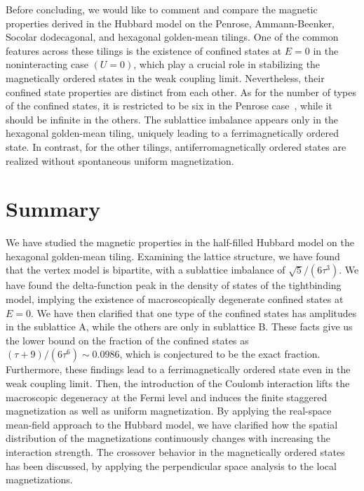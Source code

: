 \documentclass[aps,twocolumn,pra,superscriptaddress,amsmath,amssymb]{revtex4-1}
\begin{document}
Before concluding,
we would like to comment and compare the magnetic properties derived in the Hubbard model
on the Penrose, Ammann-Beenker, Socolar dodecagonal, and hexagonal golden-mean tilings.
One of the common features across these tilings is the existence of confined states at $E=0$
in the noninteracting case $(U=0)$,
which play a crucial role in stabilizing the magnetically ordered states
in the weak coupling limit.
Nevertheless, their confined state properties are distinct from each other.
As for the number of types of the confined states,
it is restricted to be six in the Penrose case~\cite{KohmotoSutherland,Arai},
while it should be infinite in the others.
The sublattice imbalance appears only in the hexagonal golden-mean tiling, uniquely
leading to a ferrimagnetically ordered state.
In contrast, for the other tilings, antiferromagnetically ordered states are realized
without spontaneous uniform magnetization.

\section{Summary}\label{sec:summmary}
We have studied the magnetic properties in the half-filled Hubbard model
on the hexagonal golden-mean tiling.
Examining the lattice structure, we have found that the vertex model is bipartite,
with a sublattice imbalance of $\sqrt{5}/(6\tau^3)$.
We have found the delta-function peak in the density of states of the tightbinding model,
implying the existence of macroscopically degenerate confined states at $E=0$.
We have then clarified that one type of the confined states has amplitudes in the sublattice A, while the others are only in sublattice B.
These facts give us the lower bound on the fraction of the confined states as
$(\tau+9)/(6\tau^6)\sim 0.0986$,
which is conjectured to be the exact fraction.
Furthermore, these findings lead to a ferrimagnetically ordered state even in the weak coupling limit.
Then, the introduction of the Coulomb interaction lifts the macroscopic degeneracy at the Fermi level
and induces the finite staggered magnetization as well as uniform magnetization.
By applying the real-space mean-field approach to the Hubbard model,
we have clarified how the spatial distribution of the magnetizations continuously changes
with increasing the interaction strength.
The crossover behavior in the magnetically ordered states has been discussed,
by applying the perpendicular space analysis to the local magnetizations.
\end{document}

